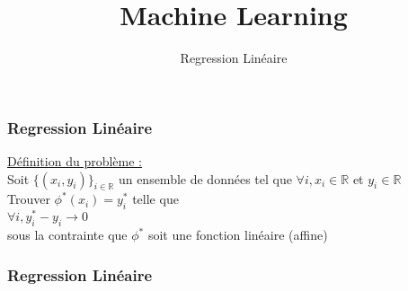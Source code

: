 \documentclass{formation}
\title{Machine Learning}
\subtitle{Regression Linéaire}
\begin{document}
\maketitle

\begin{frame}
  \frametitle{Regression Linéaire}
  \underline{Définition du problème :}\\
  \newline
  Soit $\{( x_i , y_i)\}_{i \in \mathbb{R}}$ un ensemble de données tel que $\forall i, x_i \in \mathbb{R}$ et $y_i \in \mathbb{R}$ \\
  \newline
  Trouver $\phi^*(x_i) = y_i^*$ telle que \\
  \newline
  $\forall i, y^*_i-y_i \rightarrow 0$ \\
  sous la contrainte que $\phi^*$ soit une fonction linéaire (affine)
\end{frame}

\begin{frame}
  \frametitle{Regression Linéaire}
\end{frame}
\end{document}
